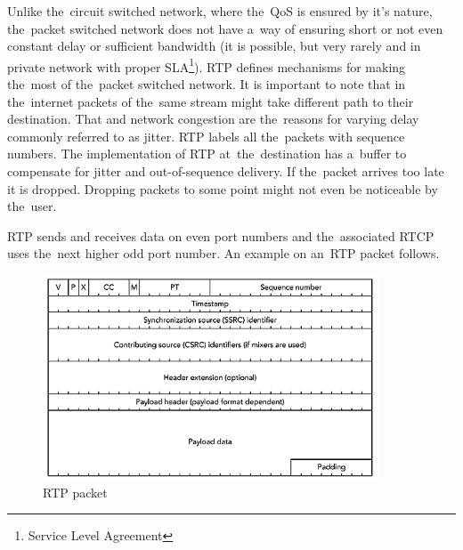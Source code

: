 Unlike the~circuit switched network, where the~QoS is ensured by it's nature, the~packet switched network does not have a~way of ensuring short or not even constant delay or sufficient bandwidth (it is possible, but very rarely and in private network with proper SLA\footnote{Service Level Agreement}). RTP defines mechanisms for making the~most of the~packet switched network. It is important to note that in the~internet packets of the~same stream might take different path to their destination. That and network congestion are the~reasons for varying delay commonly referred to as jitter. RTP labels all the~packets with sequence numbers. The implementation of RTP at~the~destination has a~buffer to compensate for jitter and out-of-sequence delivery. If the~packet arrives too late it is dropped. Dropping packets to some point might not even be noticeable by the~user. 

RTP sends and receives data on even port numbers and the~associated RTCP uses the~next higher odd port number. An example on an~RTP packet follows. 

\begin{figure}[ht]
	\begin{center}
	\includegraphics[width=10cm]{fig/rtp-packet.png}
	\caption{RTP packet~\cite{rtpBook}}
	\label{fig:rtpPacket}
\end{center}
\end{figure}


